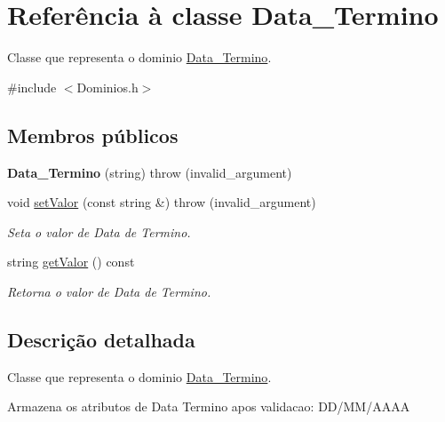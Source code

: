 \hypertarget{class_data___termino}{
\section{\-Referência à classe \-Data\-\_\-\-Termino}
\label{class_data___termino}
}


\-Classe que representa o dominio \hyperlink{class_data___termino}{\-Data\-\_\-\-Termino}.  




{\ttfamily \#include $<$\-Dominios.\-h$>$}

\subsection*{\-Membros públicos}
\begin{DoxyCompactItemize}
\item 
\hypertarget{class_data___termino_a9b0b1997a45f09b796530e052ffa4baa}{
{\bfseries \-Data\-\_\-\-Termino} (string)  throw (invalid\-\_\-argument)}
\label{class_data___termino_a9b0b1997a45f09b796530e052ffa4baa}

\item 
void \hyperlink{class_data___termino_a9aaa3f75e18900d968a38901c8de4984}{set\-Valor} (const string \&)  throw (invalid\-\_\-argument)
\begin{DoxyCompactList}\small\item\em \-Seta o valor de \-Data de \-Termino. \end{DoxyCompactList}\item 
string \hyperlink{class_data___termino_a318688c139a0aacad5975c70c3fd2f9a}{get\-Valor} () const 
\begin{DoxyCompactList}\small\item\em \-Retorna o valor de \-Data de \-Termino. \end{DoxyCompactList}\end{DoxyCompactItemize}


\subsection{\-Descrição detalhada}
\-Classe que representa o dominio \hyperlink{class_data___termino}{\-Data\-\_\-\-Termino}. 

\-Armazena os atributos de \-Data \-Termino apos validacao\-: \-D\-D/\-M\-M/\-A\-A\-A\-A 

